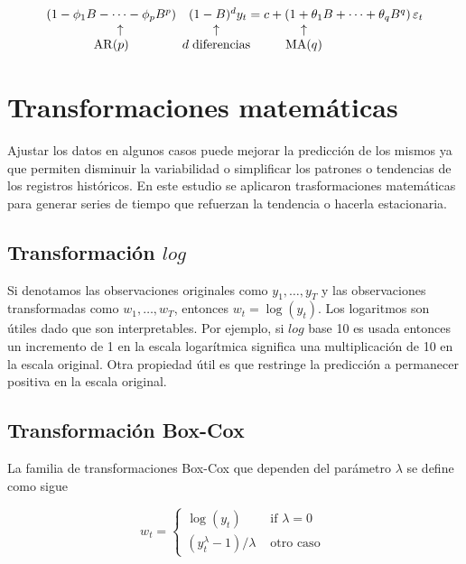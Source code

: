 \begin{equation*}
	\begin{array}{ccc}
		\left(1-\phi_{1} B-\cdots-\phi_{p} B^{p}\right) & (1-B)^{d} y_{t}=c+\left(1+\theta_{1} B+\cdots+\theta_{q} B^{q}\right) \varepsilon_{t}\\
		\hspace{0.5cm}\uparrow & \hspace{-5cm}\uparrow & \hspace{-7cm}\uparrow \\
		\operatorname{AR}(p) & \hspace{-5cm}d\hspace{0.1cm}\text{diferencias} & \hspace{-7cm}\operatorname{MA}(q)
	\end{array}
\end{equation*}
\section{Transformaciones matemáticas}
Ajustar los datos en algunos casos puede mejorar la predicción de los mismos ya que permiten disminuir la variabilidad o simplificar los patrones o tendencias de los registros históricos. En este estudio se aplicaron trasformaciones matemáticas para generar series de tiempo que refuerzan la tendencia o hacerla estacionaria.


\subsection{Transformación $log$}

Si denotamos las observaciones originales como $y_{1}, \ldots, y_{T}$ y las observaciones transformadas como $w_{1}, \ldots, w_{T}$, entonces $w_{t}=\log \left(y_{t}\right)$. Los logaritmos son útiles dado que son interpretables. Por ejemplo, si $log$ base 10 es usada entonces un incremento de 1 en la escala logarítmica significa una multiplicación de 10 en la escala original.  
Otra propiedad útil es que restringe la predicción a permanecer positiva en la escala original. 

\subsection{Transformación Box-Cox}
La familia de transformaciones Box-Cox que dependen del parámetro $\lambda$ se define como sigue

\[
w_{t}= \begin{cases}\log \left(y_{t}\right) & \text { if } \lambda=0 \\ \left(y_{t}^{\lambda}-1\right) / \lambda & \text { otro caso }\end{cases}
\]

